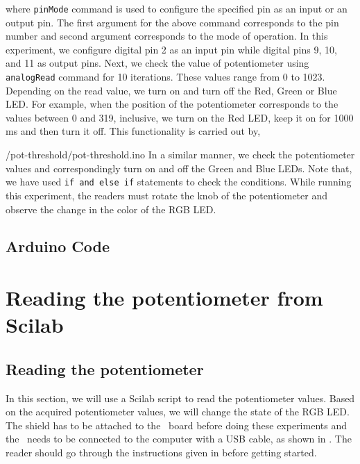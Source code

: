 where {\tt pinMode} command is used to configure the specified pin as
an input or an output pin. The first argument for the above command
corresponds to the pin number and second argument corresponds to the
mode of operation. In this experiment, we configure digital pin 2 as
an input pin while digital pins 9, 10, and 11 as output pins. Next, we
check the value of potentiometer using {\tt analogRead} command for 10
iterations. These values range from 0 to 1023. Depending on the read
value, we turn on and turn off the Red, Green or Blue LED. For
example, when the position of the potentiometer corresponds to the
values between 0 and 319, inclusive, we turn on the Red LED, keep it
on for 1000 ms and then turn it off. This functionality is carried out
by,

                {\LocPotardcode/pot-threshold/pot-threshold.ino}
In a similar manner,
we check the potentiometer values and correspondingly turn on and off
the Green and Blue LEDs. Note that, we have used {\tt if and else if}
statements to check the conditions. While running this experiment, 
the readers must rotate the knob of the potentiometer and observe 
the change in the color of the RGB LED.  

\subsection{Arduino Code}
\lstset{style=mystyle}
\label{sec:pot-arduino-code}

\begin{ardcode}
\label{ard:pot-100}

\end{ardcode}

\section{Reading the potentiometer from Scilab}
\subsection{Reading the potentiometer}
In this section, we will use a Scilab script to read the potentiometer
values.  Based on the acquired potentiometer values, we will change
the state of the RGB LED. The shield has to be attached to the \arduino\ board
before doing these experiments and the \arduino\ needs to be connected to the computer 
with a USB cable, as shown in .
The reader should go through the instructions given in
 before getting started. 

